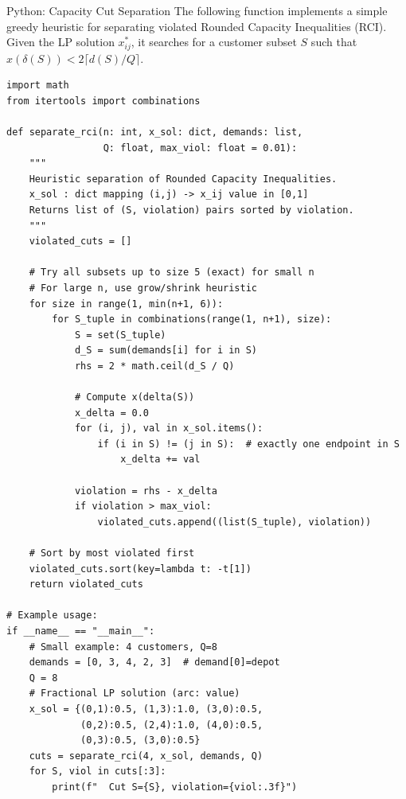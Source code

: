 \documentclass[aspectratio=169,10pt]{beamer}
\begin{document}
\begin{frame}[fragile]{Python: Capacity Cut Separation}
The following function implements a simple greedy heuristic for separating
violated Rounded Capacity Inequalities (RCI). Given the LP solution
$x^*_{ij}$, it searches for a customer subset $S$ such that
$x(\delta(S)) < 2\lceil d(S)/Q \rceil$.

\begin{lstlisting}[caption={Heuristic separation of Rounded Capacity Inequalities}]
import math
from itertools import combinations

def separate_rci(n: int, x_sol: dict, demands: list,
                 Q: float, max_viol: float = 0.01):
    """
    Heuristic separation of Rounded Capacity Inequalities.
    x_sol : dict mapping (i,j) -> x_ij value in [0,1]
    Returns list of (S, violation) pairs sorted by violation.
    """
    violated_cuts = []

    # Try all subsets up to size 5 (exact) for small n
    # For large n, use grow/shrink heuristic
    for size in range(1, min(n+1, 6)):
        for S_tuple in combinations(range(1, n+1), size):
            S = set(S_tuple)
            d_S = sum(demands[i] for i in S)
            rhs = 2 * math.ceil(d_S / Q)

            # Compute x(delta(S))
            x_delta = 0.0
            for (i, j), val in x_sol.items():
                if (i in S) != (j in S):  # exactly one endpoint in S
                    x_delta += val

            violation = rhs - x_delta
            if violation > max_viol:
                violated_cuts.append((list(S_tuple), violation))

    # Sort by most violated first
    violated_cuts.sort(key=lambda t: -t[1])
    return violated_cuts

# Example usage:
if __name__ == "__main__":
    # Small example: 4 customers, Q=8
    demands = [0, 3, 4, 2, 3]  # demand[0]=depot
    Q = 8
    # Fractional LP solution (arc: value)
    x_sol = {(0,1):0.5, (1,3):1.0, (3,0):0.5,
             (0,2):0.5, (2,4):1.0, (4,0):0.5,
             (0,3):0.5, (3,0):0.5}
    cuts = separate_rci(4, x_sol, demands, Q)
    for S, viol in cuts[:3]:
        print(f"  Cut S={S}, violation={viol:.3f}")
\end{lstlisting}
\end{frame}
\end{document}
